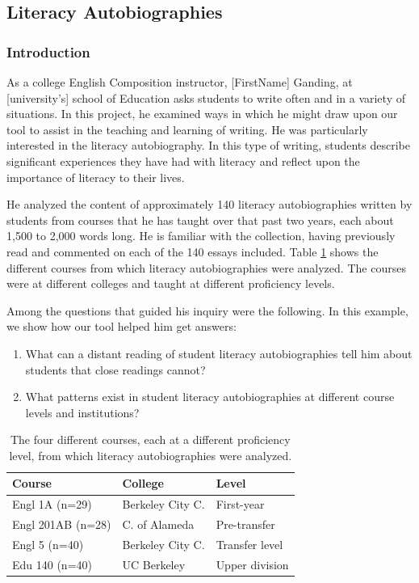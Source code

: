 \documentclass{sig-alternate}
\begin{document}
\subsection{Literacy Autobiographies}

\subsubsection{Introduction}
As a college English Composition instructor,  [FirstName] Ganding, at  [university's] school of Education asks students to write often and in a variety of situations. In this project, he examined ways in which he might draw upon our tool to assist in the teaching and learning of writing. He was particularly interested in the literacy autobiography. In this type of writing, students describe significant experiences they have had with literacy and reflect upon the importance of literacy to their lives.  

He analyzed the content of approximately 140 literacy autobiographies written by students from courses that he has taught over that past two years, each about 1,500 to 2,000 words long. He is familiar with the collection, having previously read and commented on each of the 140 essays included.  Table \ref{table:rex-courses} shows the different courses from which literacy autobiographies were analyzed. The courses were at different colleges and taught at different proficiency levels.

Among the questions that guided his inquiry were the following. In this example, we show how our tool helped him get answers:
\begin{enumerate}
\item What can a distant reading of student literacy autobiographies tell him about students that close readings cannot?
\item What patterns exist in student literacy autobiographies at different course levels and institutions?
\end{enumerate}


\begin{table}
\begin{tabular}{lll}
Course& College & Level \\
\hline
Engl 1A (n=29) & Berkeley City C.& First-year \\
Engl 201AB (n=28) & C. of Alameda & Pre-transfer \\
Engl 5 (n=40) & Berkeley City C. & Transfer level \\
Edu 140 (n=40) & UC Berkeley & Upper division \\
\end{tabular}
\caption{The four different courses, each at a different proficiency level, from which literacy autobiographies were analyzed. \label{table:rex-courses}}
\end{table}
\end{document}
